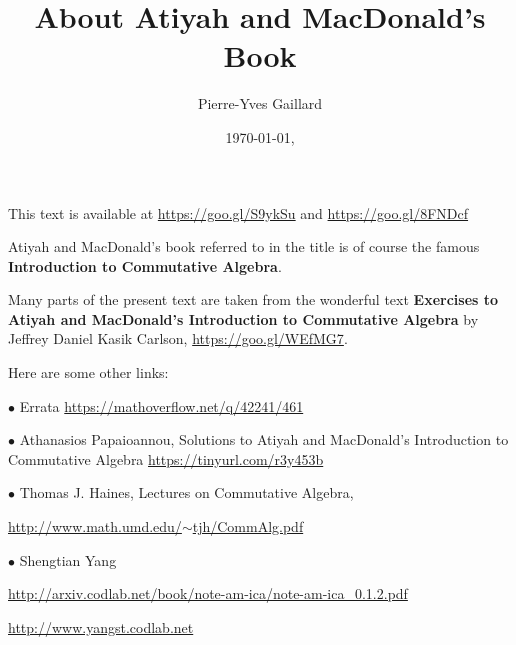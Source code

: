 \documentclass[parskip=half,fontsize=12pt]{scrartcl}%
\title{About Atiyah and MacDonald's Book}
\author{Pierre-Yves Gaillard}
\date{\today,\currenttime}
\newcommand{\oo}{\operatorname}\newcommand{\ooo}{\operatorname*}
\newcommand{\bu}{\bullet}
\begin{document}


\maketitle\tableofcontents

This text is available at \href{http://www.iecl.univ-lorraine.fr/~Pierre-Yves.Gaillard/DIVERS/Atiyah_MacDonald_c/}{https://goo.gl/S9ykSu} and \href{https://github.com/Pierre-Yves-Gaillard/Atiyah_MacDonald_c/blob/master/Atiyah_MacDonald_c.tex}{https://goo.gl/8FNDcf}%

Atiyah and MacDonald's book referred to in the title is of course the famous \textbf{Introduction to Commutative Algebra}.

Many parts of the present text are taken from the wonderful text \textbf{Exercises to Atiyah and MacDonald's Introduction to Commutative Algebra} by Jeffrey Daniel Kasik Carlson, \href{https://goo.gl/WEfMG7}{https://goo.gl/WEfMG7}.

Here are some other links:

$\bu$ Errata \href{https://mathoverflow.net/q/42241/461}{https://mathoverflow.net/q/42241/461}


$\bu$ Athanasios Papaioannou, Solutions to Atiyah and MacDonald’s Introduction to Commutative Algebra \href{https://tinyurl.com/r3y453b}{https://tinyurl.com/r3y453b}


$\bu$ Thomas J. Haines, Lectures on Commutative Algebra, 

\href{http://www.math.umd.edu/~tjh/CommAlg.pdf}{http://www.math.umd.edu/$\sim$tjh/CommAlg.pdf}

$\bu$ Shengtian Yang 

\href{http://arxiv.codlab.net/book/note-am-ica/note-am-ica_0.1.2.pdf}{\small http://arxiv.codlab.net/book/note-am-ica/note-am-ica\_0.1.2.pdf}

\href{http://www.yangst.codlab.net}{http://www.yangst.codlab.net}
\end{document}
